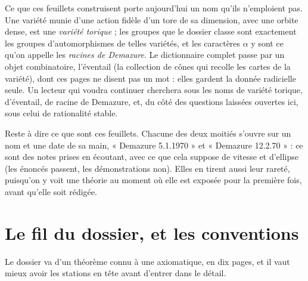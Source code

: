 \documentclass[11pt,a4paper]{article}
\begin{document}
\begin{resume}
Ce que ces feuillets construisent porte aujourd'hui un nom qu'ils n'emploient
pas. Une variété munie d'une action fidèle d'un tore de sa dimension, avec une
orbite dense, est une \emph{variété torique} ; les groupes que le dossier
classe sont exactement les groupes d'automorphismes de telles variétés, et les
caractères $\alpha$ y sont ce qu'on appelle les \emph{racines de Demazure}. Le
dictionnaire complet passe par un objet combinatoire, l'éventail (la
collection de cônes qui recolle les cartes de la variété), dont ces pages ne
disent pas un mot : elles gardent la donnée radicielle seule. Un lecteur qui
voudra continuer cherchera sous les noms de variété torique, d'éventail, de
racine de Demazure, et, du côté des questions laissées ouvertes ici, sous celui
de rationalité stable.

Reste à dire ce que sont ces feuillets. Chacune des deux moitiés s'ouvre sur
un nom et une date de sa main, « Demazure 5.1.1970 » et « Demazure 12.2.70 » :
ce sont des notes prises en écoutant, avec ce que cela suppose de vitesse et
d'ellipse (les énoncés passent, les démonstrations non). Elles en tirent aussi
leur rareté, puisqu'on y voit une théorie au moment où elle est exposée pour la
première fois, avant qu'elle soit rédigée.

\end{resume}

\section*{Le fil du dossier, et les conventions}

Le dossier va d'un théorème connu à une axiomatique, en dix pages, et il vaut
mieux avoir les stations en tête avant d'entrer dans le détail.
\end{document}
